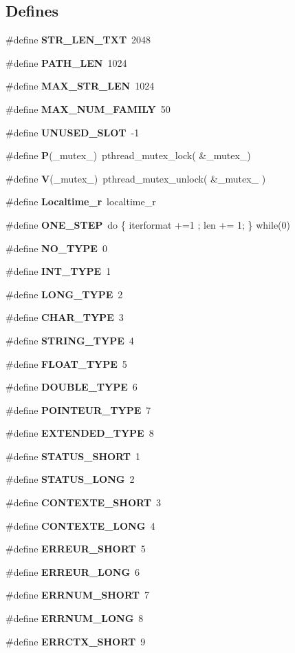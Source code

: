\subsection*{Defines}
\begin{CompactItemize}
\item 
\#define {\bf STR\_\-LEN\_\-TXT}\ 2048
\item 
\#define {\bf PATH\_\-LEN}\ 1024
\item 
\#define {\bf MAX\_\-STR\_\-LEN}\ 1024
\item 
\#define {\bf MAX\_\-NUM\_\-FAMILY}\ 50
\item 
\#define {\bf UNUSED\_\-SLOT}\ -1
\item 
\#define {\bf P}(\_\-mutex\_\-)\ pthread\_\-mutex\_\-lock( \&\_\-mutex\_\-)
\item 
\#define {\bf V}(\_\-mutex\_\-)\ pthread\_\-mutex\_\-unlock( \&\_\-mutex\_\- )
\item 
\#define {\bf Localtime\_\-r}\ localtime\_\-r
\item 
\#define {\bf ONE\_\-STEP}\ do \{ iterformat +=1 ; len += 1; \} while(0)
\item 
\#define {\bf NO\_\-TYPE}\ 0
\item 
\#define {\bf INT\_\-TYPE}\ 1
\item 
\#define {\bf LONG\_\-TYPE}\ 2
\item 
\#define {\bf CHAR\_\-TYPE}\ 3
\item 
\#define {\bf STRING\_\-TYPE}\ 4
\item 
\#define {\bf FLOAT\_\-TYPE}\ 5
\item 
\#define {\bf DOUBLE\_\-TYPE}\ 6
\item 
\#define {\bf POINTEUR\_\-TYPE}\ 7
\item 
\#define {\bf EXTENDED\_\-TYPE}\ 8
\item 
\#define {\bf STATUS\_\-SHORT}\ 1
\item 
\#define {\bf STATUS\_\-LONG}\ 2
\item 
\#define {\bf CONTEXTE\_\-SHORT}\ 3
\item 
\#define {\bf CONTEXTE\_\-LONG}\ 4
\item 
\#define {\bf ERREUR\_\-SHORT}\ 5
\item 
\#define {\bf ERREUR\_\-LONG}\ 6
\item 
\#define {\bf ERRNUM\_\-SHORT}\ 7
\item 
\#define {\bf ERRNUM\_\-LONG}\ 8
\item 
\#define {\bf ERRCTX\_\-SHORT}\ 9
\item 

\end{CompactItemize}
